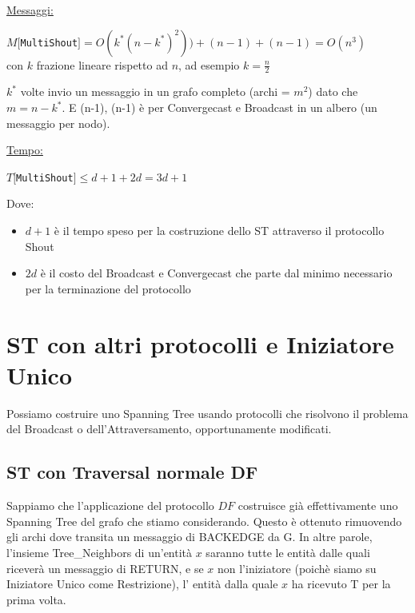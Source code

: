 
\underline{Messaggi:}
\begin{center}
  $M[$\texttt{MultiShout}$] = O(k^*(n-k^*)^2)) + (n-1)+ (n-1) = O(n^3)$\\
  con $k$ frazione lineare rispetto ad $n$, ad esempio $k=\frac{n}{2}$
\end{center}
$k^*$ volte invio un messaggio in un grafo completo (archi = $m^2$) dato che $m=n-k^*$. E (n-1), (n-1) è per Convergecast e Broadcast in un albero (un messaggio per nodo).

\underline{Tempo:}
\begin{center}
  $T[$\texttt{MultiShout}$] \leq d + 1 + 2d = 3d + 1$
\end{center}
Dove:
\begin{itemize}
    \item  $d+1$ è il tempo speso per la costruzione dello ST attraverso il protocollo Shout
    \item $2d$ è il costo del Broadcast e Convergecast che parte dal minimo necessario per la terminazione del protocollo
\end{itemize}

\section{ST con altri protocolli e Iniziatore Unico}
Possiamo costruire uno Spanning Tree usando protocolli che risolvono il problema del Broadcast o dell'Attraversamento, opportunamente modificati.

\subsection{ST con Traversal normale DF}
Sappiamo che l'applicazione del protocollo $DF$ costruisce già effettivamente uno Spanning Tree del grafo che stiamo considerando. Questo è ottenuto rimuovendo gli archi dove transita un messaggio di BACKEDGE da G. In altre parole, l'insieme Tree\_Neighbors di un'entità $x$ saranno tutte le entità dalle quali riceverà un messaggio di RETURN, e se $x$ non l'iniziatore (poichè siamo su Iniziatore Unico come Restrizione), l' entità dalla quale $x$ ha ricevuto T per la prima volta.

